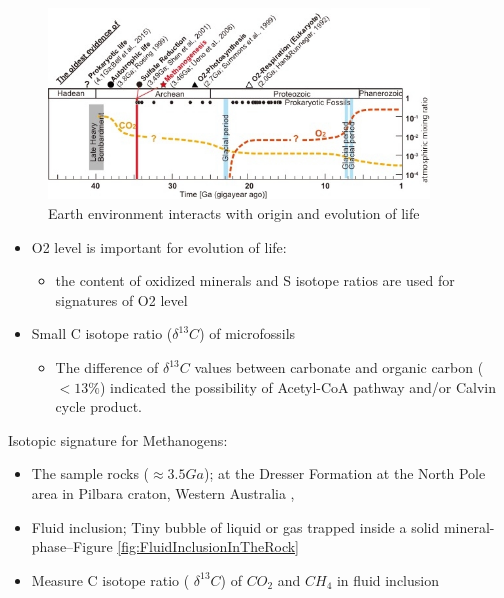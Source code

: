 \documentclass[]{article}
\begin{document}
\begin{figure}[H]
	\caption{Earth environment interacts with origin and evolution of life}\label{fig:Timeline}
	\includegraphics[width=0.9\textwidth]{Timeline}
\end{figure}

\begin{itemize}
	\item O2 level is important for evolution of life:
	\begin{itemize}
		\item the content of oxidized minerals and S isotope ratios are used for
		signatures of O2 level
	\end{itemize}
	\item  Small C isotope ratio ($\delta^{13}C$) of microfossils
	\begin{itemize}
		\item 	The difference of $\delta^{13}C$ values between carbonate and organic carbon ($<13\%$) indicated the possibility of Acetyl-CoA pathway
		and/or Calvin cycle product.
	\end{itemize}
\end{itemize}

Isotopic signature for Methanogens:
\begin{itemize}
	\item The sample rocks ($\approx 3.5Ga$); at the Dresser Formation at the North Pole area in Pilbara craton, Western Australia \cite{ueno2006evidence},
	\item Fluid inclusion; Tiny bubble of liquid or gas trapped inside a solid mineral-phase--Figure \ref{fig:FluidInclusionInTheRock}
	\item Measure C isotope ratio ( $\delta^{13}C$) of $CO_2$ and $CH_4$ in fluid inclusion
\end{itemize}
\end{document}
